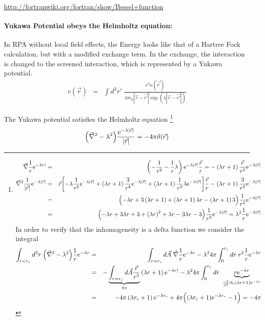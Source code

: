 \documentclass[11pt,a4paper]{report}
\begin{document}
\url{http://fortranwiki.org/fortran/show/Bessel+function}

\paragraph{Yukawa Potential obeys the Helmholtz equation:}
In RPA without local field effects, the Energy looks like that of a
Hartree Fock calculation, but with a modified exchange term. In the
exchange, the interaction is changed to the screened interaction,
which is represented by a Yukawa potential.
\begin{eqnarray}
v(\vec{r})&=&
\int d^3r'\; \frac{e^2 n(\vec{r'})}
{4\pi\epsilon_0|\vec{r}-\vec{r'}|\exp(\lambda|\vec{r}-\vec{r'}|)}
\end{eqnarray}

The Yukawa potential satisfies the Helmholtz equation
\footnote{
\begin{eqnarray}
\vec{\nabla}\frac{1}{r}\mathrm{e}^{-\lambda r|}
&=&\left(-\frac{1}{r^2}-\frac{1}{r}\lambda\right)\mathrm{e}^{-\lambda|\vec{r}|}
\frac{\vec{r}}{r}
=-\left(\lambda r+1\right)\frac{\vec{r}}{r^3}\mathrm{e}^{-\lambda|\vec{r}|}
\nonumber\\
\vec{\nabla}^2\frac{1}{|\vec{r}|}\mathrm{e}^{-\lambda|\vec{r}|}
&=&
\vec{r}\biggl[
-\lambda\frac{1}{r^3}\mathrm{e}^{-\lambda|\vec{r}|}
+\left(\lambda r+1\right)\frac{3}{r^4}\mathrm{e}^{-\lambda|\vec{r}|}
+\left(\lambda r+1\right)\frac{1}{r^3}\lambda\mathrm{e}^{-\lambda|\vec{r}|}
\biggr]\frac{\vec{r}}{r}
-\left(\lambda r+1\right)\frac{3}{r^3}\mathrm{e}^{-\lambda|\vec{r}|}
\nonumber\\
&=&
\Bigl(
-\lambda r
+3\left(\lambda r+1\right)
+\left(\lambda r+1\right)\lambda r
-\left(\lambda r+1\right)3
\Bigr)
\frac{1}{r^3}\mathrm{e}^{-\lambda|\vec{r}|}
\nonumber\\
&=&
\Bigl(
-\lambda r
+3\lambda r+3
+\left(\lambda r\right)^2+\lambda r
-3\lambda r-3
\Bigr)
\frac{1}{r^3}\mathrm{e}^{-\lambda|\vec{r}|}
=\lambda^2\frac{1}{r}\mathrm{e}^{-\lambda|\vec{r}|}
\nonumber\\
\end{eqnarray}
In order to verify that the inhomogeneity is a delta function we
consider the integral
\begin{eqnarray}
\int_{r<r_c} d^3r\;\Bigl(\vec{\nabla}^2-\lambda^2\Bigr)
\frac{1}{r}\mathrm{e}^{-\lambda r}&=&
\int_{r=r_c} d\vec{A}\;\vec{\nabla}\frac{1}{r}\mathrm{e}^{-\lambda r}
-\lambda^2 4\pi\int_0^{r_c}dr\; r^2\frac{1}{r}\mathrm{e}^{-\lambda r}
\nonumber\\
&=&
-\underbrace{\int_{r=r_c} d\vec{A}\frac{\vec{r}}{r^3}}_{4\pi}
\left(\lambda r+1\right)\mathrm{e}^{-\lambda r|}
-\lambda^2 4\pi\int_0^{r_c}dr\; 
\underbrace{r\mathrm{e}^{-\lambda r}
}_{\frac{-1}{\lambda^2}\partial_r (\lambda r+1)\mathrm{e}^{-\lambda r}}
\nonumber\\
&=&
-4\pi 
\left(\lambda r_c+1\right)\mathrm{e}^{-\lambda r_c}
+4\pi \Bigl((\lambda r_c+1)\mathrm{e}^{-\lambda r_c}-1\Bigr)=-4\pi
\end{eqnarray}
}
\begin{eqnarray}
\Bigl(\vec{\nabla}^2-\lambda^2\Bigr)
\frac{\mathrm{e}^{-\lambda|\vec{r}|}}{|\vec{r}|}=-4\pi\delta(\vec{r})
\end{eqnarray}
\end{document}
